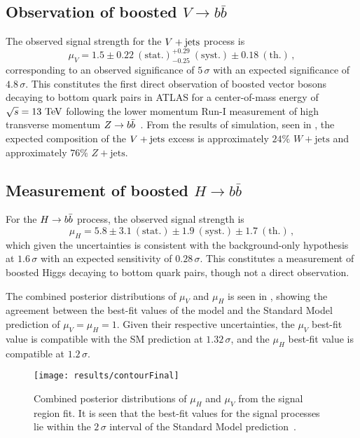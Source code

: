 \clearpage
\subsection{Observation of boosted $V\to b\bar{b}$}

The observed signal strength for the $V + \text{jets}$ process is
\[
 \mu_{V} = 1.5 \pm 0.22~\mathrm{(stat.)}^{+0.29}_{-0.25}~\mathrm{(syst.)} \pm 0.18~\mathrm{(th.)}\,,
\]
corresponding to an observed significance of $5\,\sigma$ with an expected significance of $4.8\,\sigma$.
This constitutes the first direct observation of boosted vector bosons decaying to bottom quark pairs in ATLAS for a center-of-mass energy of $\sqrt{s}=13~\mathrm{TeV}$ following the lower momentum Run-I measurement of high transverse momentum $Z \to b\bar{b}$~\cite{STDM-2013-04}.
From the results of simulation, seen in , the expected composition of the $V + \text{jets}$ excess is approximately $24\%$ $W+\mathrm{jets}$ and approximately $76\%$ $Z+\mathrm{jets}$.

\subsection{Measurement of boosted $H\to b\bar{b}$}

For the $H \to b\bar{b}$ process, the observed signal strength is
\[
 \mu_{H} = 5.8 \pm 3.1~\mathrm{(stat.)} \pm 1.9~\mathrm{(syst.)} \pm 1.7~\mathrm{(th.)}\,,
\]
which given the uncertainties is consistent with the background-only hypothesis at $1.6\,\sigma$ with an expected sensitivity of $0.28\,\sigma$.
This constitutes a measurement of boosted Higgs decaying to bottom quark pairs, though not a direct observation.

The combined posterior distributions of $\mu_{V}$ and $\mu_{H}$ is seen in , showing the agreement between the best-fit values of the model and the Standard Model prediction of $\mu_{V} = \mu_{H} = 1$.
Given their respective uncertainties, the $\mu_{V}$ best-fit value is compatible with the SM prediction at $1.32\,\sigma$, and the $\mu_{H}$ best-fit value is compatible at $1.2\,\sigma$.

\begin{figure}[htbp]
 \centering
 \texttt{[image: results/contourFinal]}
 \caption[Compatibility of best-fit values for $\mu_{H}$ and $\mu_{V}$ with Standard Model predicted values.]{%
  Combined posterior distributions of $\mu_{H}$ and $\mu_{V}$ from the signal region fit.
  It is seen that the best-fit values for the signal processes lie within the $2\,\sigma$ interval of the Standard Model prediction~\cite{ATLAS-CONF-2018-052}.}
 \label{fig:signal_strength_contour}
\end{figure}
\clearpage

